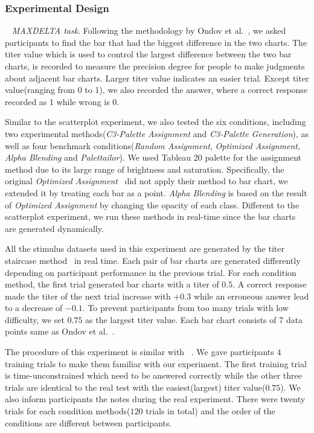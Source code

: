 \subsubsection{Experimental Design}
\
\newline
{}
\emph{MAXDELTA task}. Following the methodology by Ondov et al.~\cite{Ondov19}, we asked participants to find the bar that had the biggest difference in the two charts. The titer value which is used to control the largest difference between the two bar charts, is recorded to measure the precision degree for people to make judgments about adjacent bar charts. Larger titer value indicates an easier trial. Except titer value(ranging from 0 to 1), we also recorded the answer, where a correct response recorded as 1 while wrong is 0.


Similar to the scatterplot experiment, we also tested the six conditions, including two experimental methods(\emph{C3-Palette Assignment} and \emph{C3-Palette Generation}), as well as four benchmark conditions(\emph{Random Assignment}, \emph{Optimized Assignment}, \emph{Alpha Blending} and \emph{Palettailor}). We used Tableau 20 palette for the assignment method due to its large range of brightness and saturation. Specifically, the original \emph{Optimized Assignment}~\cite{Wang2018} did not apply their method to bar chart, we extended it by treating each bar as a point. \emph{Alpha Blending} is based on the result of \emph{Optimized Assignment} by changing the opacity of each class. Different to the scatterplot experiment, we run these methods in real-time since the bar charts are generated dynamically.

All the stimulus datasets used in this experiment are generated by the titer staircase method~\cite{Ondov19} in real time. Each pair of bar charts are generated differently depending on participant performance in the previous trial. For each condition method, the first trial generated bar charts with a titer of $0.5$. A correct response made the titer of the next trial increase with $+0.3$ while an erroneous answer lead to a decrease of $-0.1$. To prevent participants from too many trials with low difficulty, we set $0.75$ as the largest titer value. Each bar chart consists of 7 data points same as Ondov et al.~\cite{Ondov19}.

The procedure of this experiment is similar with ~\cite{Ondov19}.
We gave participants $4$ training trials to make them familiar with our experiment. The first training trial is time-unconstrained which need to be answered correctly while the other three trials are identical to the real test with the easiest(largest) titer value($0.75$). We also inform participants the notes during the real experiment. There were twenty trials for each condition methods($120$ trials in total) and the order of the conditions are different between participants.

